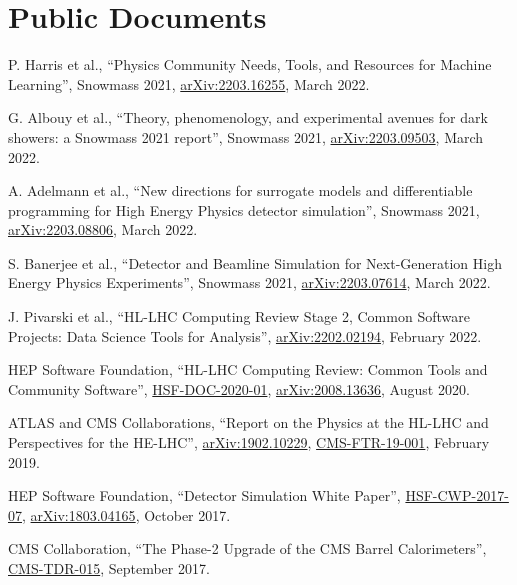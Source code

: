\section{Public Documents}
\begin{description}[leftmargin=12pt,font=\normalfont,labelsep=0em]
\item P. Harris et al., ``Physics Community Needs, Tools, and Resources for Machine Learning'', Snowmass 2021, \href{https://arxiv.org/abs/2203.16255}{arXiv:2203.16255}, March 2022.
\item G. Albouy et al., ``Theory, phenomenology, and experimental avenues for dark showers: a Snowmass 2021 report'', Snowmass 2021, \href{https://arxiv.org/abs/2203.09503}{arXiv:2203.09503}, March 2022.
\item A. Adelmann et al., ``New directions for surrogate models and differentiable programming for High Energy Physics detector simulation'', Snowmass 2021, \href{https://arxiv.org/abs/2203.08806}{arXiv:2203.08806}, March 2022.
\item S. Banerjee et al., ``Detector and Beamline Simulation for Next-Generation High Energy Physics Experiments'', Snowmass 2021, \href{https://arxiv.org/abs/2203.07614}{arXiv:2203.07614}, March 2022.
\item J. Pivarski et al., ``HL-LHC Computing Review Stage 2, Common Software Projects: Data Science Tools for Analysis'', \href{https://arxiv.org/abs/2202.02194}{arXiv:2202.02194}, February 2022.
\item HEP Software Foundation, ``HL-LHC Computing Review: Common Tools and Community Software'', \href{https://dx.doi.org/10.5281/zenodo.4009114}{HSF-DOC-2020-01}, \href{https://arxiv.org/abs/2008.13636}{arXiv:2008.13636}, August 2020.
\item \begin{sloppypar}ATLAS and CMS Collaborations, ``Report on the Physics at the HL-LHC and Perspectives for the HE-LHC'', \href{http://arxiv.org/abs/arXiv:1902.10229}{arXiv:1902.10229}, \href{https://cds.cern.ch/record/2651134}{CMS-FTR-19-001}, February 2019.\end{sloppypar}
\item HEP Software Foundation, ``Detector Simulation White Paper'', \href{http://hepsoftwarefoundation.org/activities/cwp.html}{HSF-CWP-2017-07}, \href{https://arxiv.org/abs/1803.04165}{arXiv:1803.04165}, October 2017.
\item CMS Collaboration, ``The Phase-2 Upgrade of the CMS Barrel Calorimeters'', \href{https://cds.cern.ch/record/2283187}{CMS-TDR-015}, September 2017.

\end{description}
